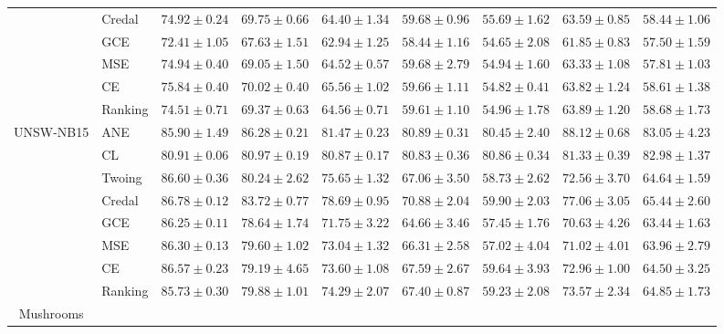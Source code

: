 \documentclass[letterpaper]{article} %
\begin{document}
\begin{table}[t]
\begin{tabular}{clccccccc}
 & Credal & $74.92 \pm 0.24$ & $69.75 \pm 0.66$ & $64.40 \pm 1.34$ & $59.68 \pm 0.96$ & $55.69 \pm 1.62$ & $63.59 \pm 0.85$ & $58.44 \pm 1.06$ \\
 & GCE    & $72.41 \pm 1.05$ & $67.63 \pm 1.51$ & $62.94 \pm 1.25$ & $58.44 \pm 1.16$ & $54.65 \pm 2.08$ & $61.85 \pm 0.83$ & $57.50 \pm 1.59$ \\
 & MSE    & $74.94 \pm 0.40$ & $69.05 \pm 1.50$ & $64.52 \pm 0.57$ & $59.68 \pm 2.79$ & $54.94 \pm 1.60$ & $63.33 \pm 1.08$ & $57.81 \pm 1.03$ \\
 & CE     & $\mathbf{75.84 \pm 0.40}$ & $70.02 \pm 0.40$ & $65.56 \pm 1.02$ & $59.66 \pm 1.11$ & $54.82 \pm 0.41$ & $63.82 \pm 1.24$ & $58.61 \pm 1.38$ \\
 & Ranking & $74.51 \pm 0.71$ & $69.37 \pm 0.63$ & $64.56 \pm 0.71$ & $59.61 \pm 1.10$ & $54.96 \pm 1.78$ & $63.89 \pm 1.20$ & $58.68 \pm 1.73$ \\
\hline
\multirow{8}{*}{UNSW-NB15}
 & ANE    & $\mathbf{85.90 \pm 1.49}$ & $\mathbf{86.28 \pm 0.21}$ & $\mathbf{81.47 \pm 0.23}$ & $\mathbf{80.89 \pm 0.31}$ & $\mathbf{80.45 \pm 2.40}$ & $\mathbf{88.12 \pm 0.68}$ & $\mathbf{83.05 \pm 4.23}$ \\
 & CL     & $80.91 \pm 0.06$ & $80.97 \pm 0.19$ & $80.87 \pm 0.17$ & $\mathbf{80.83 \pm 0.36}$ & $\mathbf{80.86 \pm 0.34}$ & $81.33 \pm 0.39$ & $\mathbf{82.98 \pm 1.37}$ \\
 & Twoing & $\mathbf{86.60 \pm 0.36}$ & $80.24 \pm 2.62$ & $75.65 \pm 1.32$ & $67.06 \pm 3.50$ & $58.73 \pm 2.62$ & $72.56 \pm 3.70$ & $64.64 \pm 1.59$ \\
 & Credal & $\mathbf{86.78 \pm 0.12}$ & $83.72 \pm 0.77$ & $78.69 \pm 0.95$ & $70.88 \pm 2.04$ & $59.90 \pm 2.03$ & $77.06 \pm 3.05$ & $65.44 \pm 2.60$ \\
 & GCE    & $86.25 \pm 0.11$ & $78.64 \pm 1.74$ & $71.75 \pm 3.22$ & $64.66 \pm 3.46$ & $57.45 \pm 1.76$ & $70.63 \pm 4.26$ & $63.44 \pm 1.63$ \\
 & MSE    & $86.30 \pm 0.13$ & $79.60 \pm 1.02$ & $73.04 \pm 1.32$ & $66.31 \pm 2.58$ & $57.02 \pm 4.04$ & $71.02 \pm 4.01$ & $63.96 \pm 2.79$ \\
 & CE     & $\mathbf{86.57 \pm 0.23}$ & $79.19 \pm 4.65$ & $73.60 \pm 1.08$ & $67.59 \pm 2.67$ & $59.64 \pm 3.93$ & $72.96 \pm 1.00$ & $64.50 \pm 3.25$ \\
 & Ranking & $85.73 \pm 0.30$ & $79.88 \pm 1.01$ & $74.29 \pm 2.07$ & $67.40 \pm 0.87$ & $59.23 \pm 2.08$ & $73.57 \pm 2.34$ & $64.85 \pm 1.73$ \\
\hline
\multirow{8}{*}{Mushrooms}

\end{tabular}
\end{table}
\end{document}
